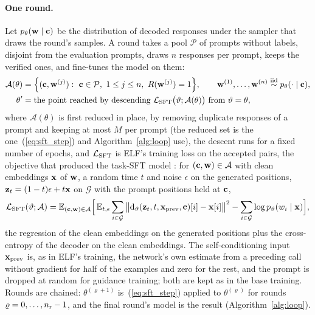 \paragraph{One round.}
Let $p_\theta({\mathbf{w}}\mid{\mathbf{c}})$ be the distribution of decoded responses under the sampler that draws the round's samples. A round takes a pool $\mathcal P$ of prompts without labels, disjoint from the evaluation prompts, draws $n$ responses per prompt, keeps the verified ones, and fine-tunes the model on them:
\begin{align}
\mathcal A(\theta)&=\Big\{(\rvc,\rvw^{(j)}):\ \rvc\in\mathcal P,\ 1\le j\le n,\ R(\rvw^{(j)})=1\Big\},\qquad \rvw^{(1)},\dots,\rvw^{(n)}\overset{\text{iid}}{\sim}p_\theta(\cdot\mid\rvc),
\label{eq:accept}\\
\theta'&=\text{the point reached by descending }\mathcal L_{\rm SFT}\big(\vartheta;\mathcal A(\theta)\big)\text{ from }\vartheta=\theta,
\label{eq:sft_step}
\end{align}
where $\mathcal A(\theta)$ is first reduced in place, by removing duplicate responses of a prompt and keeping at most $M$ per prompt (the reduced set is the one~(\ref{eq:sft_step}) and Algorithm~\ref{alg:loop} use), the descent runs for a fixed number of epochs, and $\mathcal L_{\rm SFT}$ is ELF's training loss on the accepted pairs, the objective that produced the task-SFT model \citep{hu2026elf}: for $({\mathbf{c}},{\mathbf{w}})\in\mathcal A$ with clean embeddings ${\mathbf{x}}$ of ${\mathbf{w}}$, a random time $t$ and noise $\epsilon$ on the generated positions, ${\mathbf{z}}_t=(1-t)\epsilon+t{\mathbf{x}}$ on $\mathcal G$ with the prompt positions held at ${\mathbf{c}}$,
\begin{equation}
\mathcal L_{\rm SFT}(\vartheta;\mathcal A)=\mathbb E_{({\mathbf{c}},{\mathbf{w}})\in\mathcal A}\Big[\,\mathbb E_{t,\epsilon}\sum_{i\in\mathcal G}\big\|\mathrm d_{\vartheta}({\mathbf{z}}_t,t,{\mathbf{x}}_{\rm prev},{\mathbf{c}})[i]-{\mathbf{x}}[i]\big\|^2-\sum_{i\in\mathcal G}\log p_{\vartheta}(w_i\mid{\mathbf{x}})\Big],
\label{eq:sft}
\end{equation}
the regression of the clean embeddings on the generated positions plus the cross-entropy of the decoder on the clean embeddings. The self-conditioning input ${\mathbf{x}}_{\rm prev}$ is, as in ELF's training, the network's own estimate from a preceding call without gradient for half of the examples and zero for the rest, and the prompt is dropped at random for guidance training; both are kept as in the base training. Rounds are chained: $\theta^{(\varrho+1)}$ is~(\ref{eq:sft_step}) applied to $\theta^{(\varrho)}$ for rounds $\varrho=0,\dots,n_{\rm r}-1$, and the final round's model is the result (Algorithm~\ref{alg:loop}).

